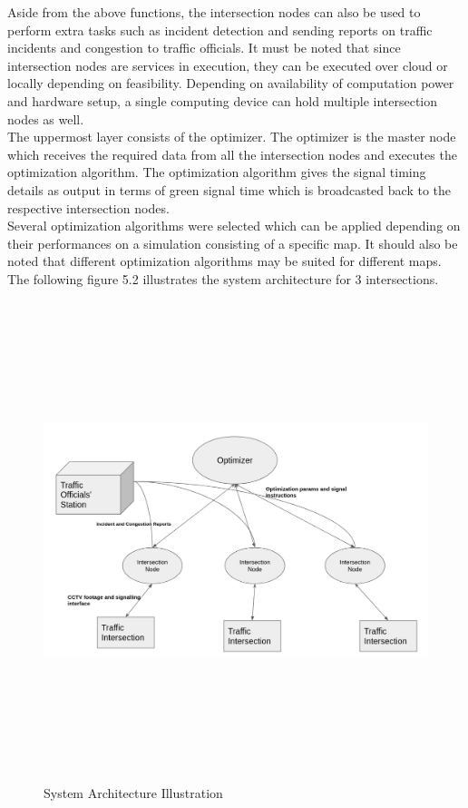 \documentclass[openany,12pt]{report}
\begin{document}
	\hspace*{0.5in}Aside from the above functions, the intersection nodes can also be used to perform extra tasks such as incident detection and sending reports on traffic incidents and congestion to traffic officials. It must be noted that since intersection nodes are services in execution, they can be executed over cloud or locally depending on feasibility. Depending on availability of computation power and hardware setup, a single computing device can hold multiple intersection nodes as well.\\
	
	\hspace*{0.5in}The uppermost layer consists of the optimizer. The optimizer is the master node which receives the required data from all the intersection nodes and executes the optimization algorithm. The optimization algorithm gives the signal timing details as output in terms of green signal time which is broadcasted back to the respective intersection nodes.\\
	
	\hspace*{0.5in}Several optimization algorithms were selected which can be applied depending on their performances on a simulation consisting of a specific map. It should also be noted that different optimization algorithms may be suited for different maps.\\
	\hspace*{0.5in}The following figure 5.2 illustrates the system architecture for 3 intersections.
	
	\begin{figure}[H]
		\centering
		\includegraphics[width=6.5in,height=5.5in]{./Diagrams/PNG/architecture}
		\caption{System Architecture Illustration}
	\end{figure}
	
\end{document}

